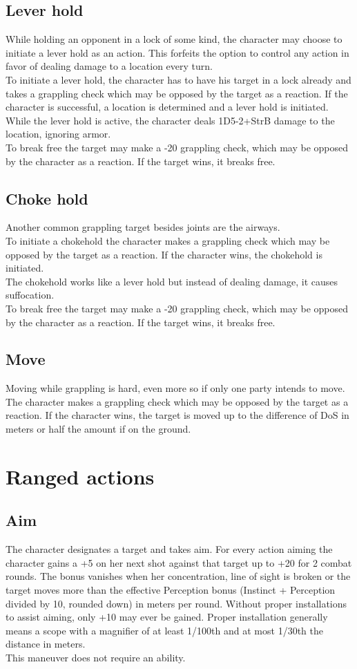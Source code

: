 \documentclass[12pt,a4paper,openany]{book}
\begin{document}
	\subsection*{Lever hold}
	While holding an opponent in a lock of some kind, the character may choose to initiate a lever hold as an action. This forfeits the option to control any action in favor of dealing damage to a location every turn.\\
	To initiate a lever hold, the character has to have his target in a lock already and takes a grappling check which may be opposed by the target as a reaction. If the character is successful, a location is determined and a lever hold is initiated.\\
	While the lever hold is active, the character deals 1D5-2+StrB damage to the location, ignoring armor.\\
	To break free the target may make a -20 grappling check, which may be opposed by the character as a reaction. If the target wins, it breaks free.
	\subsection*{Choke hold}
	Another common grappling target besides joints are the airways.\\
	To initiate a chokehold the character makes a grappling check which may be opposed by the target as a reaction. If the character wins, the chokehold is initiated.\\
	The chokehold works like a lever hold but instead of dealing damage, it causes suffocation.\\
	To break free the target may make a -20 grappling check, which may be opposed by the character as a reaction. If the target wins, it breaks free.
	\subsection*{Move}
	Moving while grappling is hard, even more so if only one party intends to move.\\
	The character makes a grappling check which may be opposed by the target as a reaction. If the character wins, the target is moved up to the difference of DoS in meters or half the amount if on the ground.
	\section{Ranged actions}
	\subsection*{Aim}
	The character designates a target and takes aim. For every action aiming the character gains a +5 on her next shot against that target up to +20 for 2 combat rounds. The bonus vanishes when her concentration, line of sight is broken or the target moves more than the effective Perception bonus (Instinct + Perception divided by 10, rounded down) in meters per round. Without proper installations to assist aiming, only +10 may ever be gained. Proper installation generally means a scope with a magnifier of at least 1/100th and at most 1/30th the distance in meters.\\
	This maneuver does not require an ability.
\end{document}
